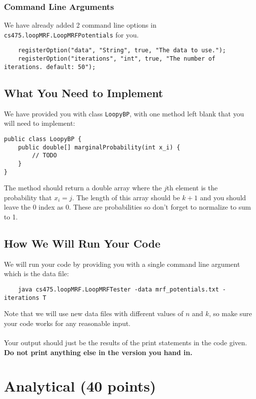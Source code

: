 \documentclass[11pt]{article}
\newcommand{\code}[1]{{\footnotesize \tt #1}}
\begin{document}
\subsubsection{Command Line Arguments}
We have already added 2 command line options in \code{cs475.loopMRF.LoopMRFPotentials} for you.
\begin{footnotesize}
\begin{verbatim}
    registerOption("data", "String", true, "The data to use.");
    registerOption("iterations", "int", true, "The number of iterations. default: 50");
\end{verbatim}
\end{footnotesize}

\subsection{What You Need to Implement} %
We have provided you with class \code{LoopyBP}, with one method left blank that you will need to implement:
\begin{verbatim}
public class LoopyBP {
    public double[] marginalProbability(int x_i) {
        // TODO
    }
}

\end{verbatim}
 The method should return a double array where the $j$th element is the probability that $x_i = j$. The length of this array should be $k+1$ and you should leave the 0 index as 0. These are probabilities so don't forget to normalize to sum to 1.


\subsection{How We Will Run Your Code} %
We will run your code by providing you with a single command line argument which is the data file:
\begin{verbatim}
    java cs475.loopMRF.LoopMRFTester -data mrf_potentials.txt -iterations T
\end{verbatim}
Note that we will use new data files with different values of $n$ and $k$, so make sure your code works for any reasonable input.\\
\\
Your output should just be the results of the print statements in the code given. {\bf Do not print anything else in the version you hand in.}

\section{Analytical (40 points)}
\end{document}
